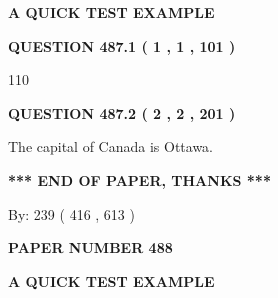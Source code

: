 \documentclass[12pt]{article}
\begin{document}
   
 \vspace{0.2in}
{\LARGE {\textbf{ A QUICK TEST EXAMPLE}}}
   
   
  
\vspace{0.2in}
  
{\textbf{\Large{QUESTION
487.1 
 ( 1 , 1 , 101 )
}}}
  
  
 
 
\noindent{}

110
 
 
  
\vspace{0.2in}
  
{\textbf{\Large{QUESTION
487.2 
 ( 2 , 2 , 201 )
}}}
  
  
 
 
\noindent{}
 
 
The capital of Canada is Ottawa.
 
 
 
 
   
   
 \vspace{0.2in}
 
   
   
   
   
\vspace{1.0in} 
{\textbf{\large{ *** END OF PAPER, THANKS *** }}} 
   
   
\hspace{1.0in} By: 
 239 ( 416 ,  613 )
   
   
   
   
\newpage 
\setcounter{page}{ 
   488001 } 
   
   
   
   
 {\textbf{ \Large{ PAPER NUMBER  488  }}}
   
   
\vspace{0.2in}
   
   
   
   
   
   
 \vspace{0.2in}
{\LARGE {\textbf{ A QUICK TEST EXAMPLE}}}
   
   
  
\vspace{0.2in}
  
\end{document}
